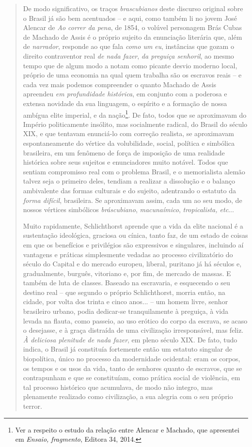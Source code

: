 \begin{quote}
De modo significativo, os traços \emph{brascubianos} deste discurso
original sobre o Brasil já são bem acentuados -- e aqui, como também li
no jovem José Alencar de \emph{Ao correr da pena}, de 1854, o volúvel
personagem Brás Cubas de Machado de Assis é o próprio sujeito da
enunciação literária que, além de \emph{narrador}, responde ao que fala
\emph{como um} \emph{eu}, instâncias que gozam o direito contraventor
real \emph{de nada fazer}, \emph{da preguiça senhoril}, ao mesmo tempo
que de algum modo a notam como picante desvio moderno local, próprio de
uma economia na qual quem trabalha são os escravos reais -- e cada vez
mais podemos compreender o quanto Machado de Assis apreendeu \emph{em
profundidade histórica}, em conjunto com a poderosa e extensa novidade
da sua linguagem, o espírito e a formação de nossa ambígua elite
imperial, e da nação\footnote{Ver a respeito o estudo da relação entre
  Alencar e Machado, que apresentei em \emph{Ensaio, fragmento}, Editora
  34, 2014.}. De fato, todos que se aproximavam do Império politicamente
insólito, mas socialmente radical, do Brasil do século XIX, e que
tentavam enunciá-lo com correção realista, se aproximavam
espontaneamente do vértice da volubilidade, social, política e simbólica
brasileira, em um fenômeno de força de imposição de uma realidade
histórica sobre seus sujeitos e enunciadores muito notável. Todos que
sentiam compromisso real com o problema Brasil, e o memorialista alemão
talvez seja o primeiro deles, tendiam a realizar a dissolução e o
balanço ambivalente das formas culturais e do sujeito, adentrando o
estatuto da \emph{forma difícil}, brasileira. Se aproximavam assim, cada
um ao seu modo, de nossos vértices simbólicos \emph{bráscubiano},
\emph{macunaímico}, \emph{tropicalista, etc}...

Muito rapidamente, Schlichthorst aprende que a vida da elite nacional é
a sustentação ideológica, graciosa ou cínica, tanto faz, de um estado de
coisas em que os benefícios e privilégios são expressivos e singulares,
incluindo aí vantagens e práticas simplesmente vedadas ao processo
civilizatório do século do Capital e do mercado europeu, liberal,
puritano já há séculos e, gradualmente, burguês, vitoriano e, por fim,
de mercado de massas. E também de luta de classes. Baseado na
escravaria, e esquecendo o seu destino real -- que segundo o próprio
Schlichthorst, morria então, na cidade, por volta dos trinta e cinco
anos... -- um homem livre, senhor brasileiro urbano, podia dedicar-se
tranquilamente à preguiça, à vida levada na flauta, como passeio, ao uso
erótico do corpo da escrava, se acaso o desejasse, e à graça distraída
de uma civilização irresponsável, mas feliz. \emph{À deliciosa plenitude
de nada fazer}, em pleno século XIX. De fato, tudo indica, o Brasil já
constituía fortemente então um estatuto singular de biopolítica, único
no processo da modernidade ocidental: eram os corpos, os tempos e os
usos da vida, tanto de senhores quanto de escravos, que se contrapunham
e que se constituíam, como prática social de violência, em tal processo
histórico que acumulava, de modo não integro, mas plenamente realizado
como civilização, a sua alegria com o seu próprio terror.


\end{quote}
